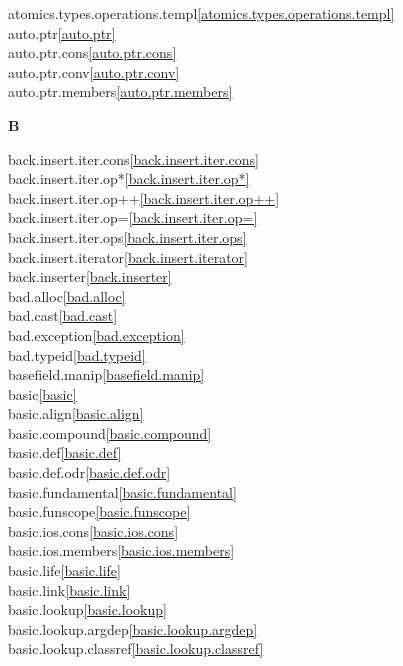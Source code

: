 \begin{multicols}{2}
atomics.types.operations.templ\quad\ref{atomics.types.operations.templ}\\
auto.ptr\quad\ref{auto.ptr}\\
auto.ptr.cons\quad\ref{auto.ptr.cons}\\
auto.ptr.conv\quad\ref{auto.ptr.conv}\\
auto.ptr.members\quad\ref{auto.ptr.members}\\
\par \textbf{B}\par
back.insert.iter.cons\quad\ref{back.insert.iter.cons}\\
back.insert.iter.op*\quad\ref{back.insert.iter.op*}\\
back.insert.iter.op++\quad\ref{back.insert.iter.op++}\\
back.insert.iter.op=\quad\ref{back.insert.iter.op=}\\
back.insert.iter.ops\quad\ref{back.insert.iter.ops}\\
back.insert.iterator\quad\ref{back.insert.iterator}\\
back.inserter\quad\ref{back.inserter}\\
bad.alloc\quad\ref{bad.alloc}\\
bad.cast\quad\ref{bad.cast}\\
bad.exception\quad\ref{bad.exception}\\
bad.typeid\quad\ref{bad.typeid}\\
basefield.manip\quad\ref{basefield.manip}\\
basic\quad\ref{basic}\\
basic.align\quad\ref{basic.align}\\
basic.compound\quad\ref{basic.compound}\\
basic.def\quad\ref{basic.def}\\
basic.def.odr\quad\ref{basic.def.odr}\\
basic.fundamental\quad\ref{basic.fundamental}\\
basic.funscope\quad\ref{basic.funscope}\\
basic.ios.cons\quad\ref{basic.ios.cons}\\
basic.ios.members\quad\ref{basic.ios.members}\\
basic.life\quad\ref{basic.life}\\
basic.link\quad\ref{basic.link}\\
basic.lookup\quad\ref{basic.lookup}\\
basic.lookup.argdep\quad\ref{basic.lookup.argdep}\\
basic.lookup.classref\quad\ref{basic.lookup.classref}\\

\end{multicols}
